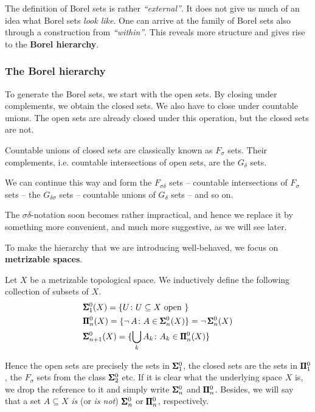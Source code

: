 The definition of Borel sets is rather \textit{``external''}. It does not give us much of an idea what Borel sets \textit{look like}. One can arrive at the family of Borel sets also through a construction from \textit{``within''}. This reveals more structure and gives rise to the \textbf{Borel hierarchy}.

\subsubsection{The Borel hierarchy}

%  
% 
%

To generate the Borel sets, we start with the open sets. By closing under complements, we obtain the closed sets. We also have to close under countable unions. The open sets are already closed under this operation, but the closed sets are not.

Countable unions of closed sets are classically known as $F_\sigma$ sets. Their complements, i.e. countable intersections of open sets, are the $G_\delta$ sets.

We can continue this way and form the $F_{\sigma\delta}$ sets -- countable intersections of $F_\sigma$ sets -- the $G_{\delta\sigma}$ sets -- countable unions of $G_\delta$ sets -- and so on.

The $\sigma\delta$-notation soon becomes rather impractical, and hence we replace it by something more convenient, and much more suggestive, as we will see later.

To make the hierarchy that we are introducing well-behaved, we focus on \textbf{metrizable spaces}.

\begin{definition}\label{def-borel-finite}Let $X$ be a metrizable topological space. We inductively define the following collection of subsets of $X$.
\begin{align*}
    & \pmb{\Sigma}^0_1(X) = \{ U \colon U\subseteq X \text{ open } \} \\
    & \pmb{\Pi}^0_n(X) = \{ \neg \, A \colon A \in \pmb{\Sigma}^0_n(X) \} = \neg \, \pmb{\Sigma}^0_n(X) \\
    & \pmb{\Sigma}^0_{n+1}(X) = \{ \bigcup_k A_k \colon A_k \in \pmb{\Pi}^0_n(X) \} 
\end{align*}
\end{definition}Hence the open sets are precisely the sets in $\pmb{\Sigma}^0_1$, the closed sets are the sets in $\pmb{\Pi}^0_1$, the $F_\sigma$ sets from the class $\pmb{\Sigma}^0_2$ etc. If it is clear what the underlying space $X$ is, we drop the reference to it and simply write $\pmb{\Sigma}^0_n$ and $\pmb{\Pi}^0_n$. Besides, we will say that a set $A \subseteq X$ \textit{is} (or \textit{is not}) $\pmb{\Sigma}^0_n$ or $\pmb{\Pi}^0_n$, respectively.

